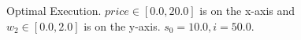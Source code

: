 \begin{figure}[h!]
    \centering
    \caption{Optimal Execution. $ price \in \left[ 0.0, 20.0 \right]$ is on the x-axis and $ w_2 \in \left[ 0.0, 2.0 \right]$ is on the y-axis. $ s_0 = 10.0, i = 50.0$.}
    \label{fig:robot1d}
\end{figure}
